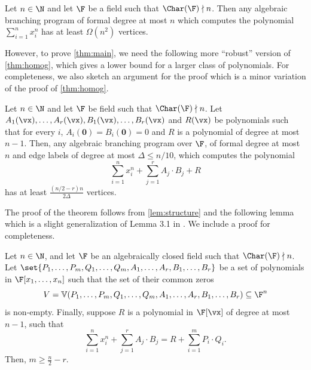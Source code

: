 \begin{theorem}[\cite{K19}]\label{thm:homog}
	Let $n \in \N$ and let $\F$ be a field such that $\Char(\F) \nmid n$. Then any algebraic branching program of formal degree at most $n$ which computes the polynomial $\sum_{i = 1}^n x_i^n$ has at least $\Omega(n^2)$ vertices. 
\end{theorem}
	
However, to prove \autoref{thm:main}, we need the following more ``robust'' version of \autoref{thm:homog}, which gives a lower bound for a larger class of polynomials. For completeness, we also sketch an argument for the proof which is a minor variation of the proof of \autoref{thm:homog}.

\begin{theorem}\label{thm:robustHomog}
	Let $n \in \N$ and let $\F$ be field such that $\Char(\F) \nmid n$.
	Let $A_1(\vx), \ldots, A_r(\vx), B_1(\vx),  \ldots, B_r(\vx)$ and $R(\vx)$ be polynomials such that for every $i$, $A_i(\mathbf{0}) = B_i(\mathbf{0}) = 0$ and $R$ is a polynomial of degree at most $n-1$. Then, any algebraic branching program over $\F$, of formal degree at most $n$ and edge labels of degree at most $\Delta \le n/10$, which computes the polynomial 
	\[\sum_{i = 1}^n x_i^n + \sum_{j = 1}^r A_j\cdot B_j + R\]
	has at least $\frac{(n/2-r)n}{2\Delta}$ vertices. 
\end{theorem}
	

The proof of the theorem follows from \autoref{lem:structure} and the following lemma which is a slight generalization of  Lemma 3.1 in \cite{K19}. We include a proof for completeness. 


\sloppy
\begin{lemma}\label{lem:varietyDimLB}
	Let $n \in \N$, and let $\F$ be an algebraically closed field such that $\Char(\F) \nmid n$. Let $\set{P_1, \ldots, P_m, Q_1, \ldots, Q_m, A_1, \ldots, A_r, B_1, \ldots, B_r}$ be a set of polynomials in $\F[x_1, \ldots, x_n]$ such that the set of their common zeros 
	\[
		V = \mathbb{V}(P_1, \ldots, P_m, Q_1, \ldots, Q_m, A_1, \ldots, A_r, B_1, \ldots, B_r) \subseteq \F^n
	\]
	is non-empty. Finally, suppose $R$ is a polynomial in $\F[\vx]$ of degree at most $n-1$, such that
	\[
		\sum_{i=1}^{n} x_i^n + \sum_{j=1}^{r} A_j \cdot B_j = R + \sum_{i=1}^{m} P_i \cdot Q_i.
	\]
	Then, $m \geq \frac{n}{2} - r$.
\end{lemma}
		
